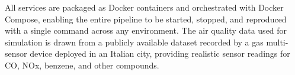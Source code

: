 All services are packaged as Docker containers and orchestrated with Docker Compose, enabling the entire pipeline to be started, stopped, and reproduced with a single command across any environment. The air quality data used for simulation is drawn from a publicly available dataset recorded by a gas multi-sensor device deployed in an Italian city\cite{devito2008}, providing realistic sensor readings for CO, NOx, benzene, and other compounds.



